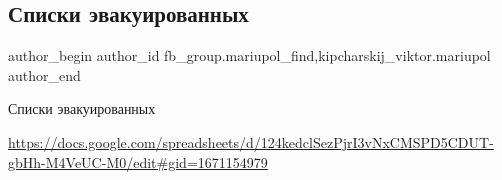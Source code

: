  
 
 
 
 

\subsection{Списки эвакуированных}
\label{sec:16_04_2022.fb.fb_group.mariupol_find.1.spiski_evakuirovannyh}
 
\ifcmt
 author_begin
   author_id fb_group.mariupol_find,kipcharskij_viktor.mariupol
 author_end
\fi

Списки эвакуированных

\url{https://docs.google.com/spreadsheets/d/124kedclSezPjrI3vNxCMSPD5CDUT-gbHh-M4VeUC-M0/edit#gid=1671154979}

